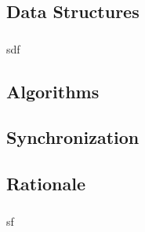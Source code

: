 \subsection{Data Structures}
	\subsubsection{}
		sdf
\subsection{Algorithms}
	\subsubsection{}
	\subsubsection{}
\subsection{Synchronization}
	\subsubsection{}
	\subsubsection{}
\subsection{Rationale}
	\subsubsection{}
		sf